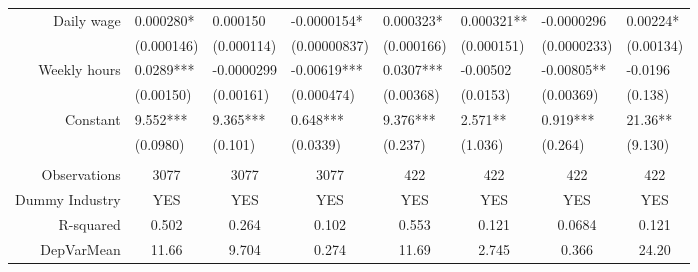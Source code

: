 \begin{tabular}{rrrrrrrr}
Daily wage & \multicolumn{1}{l}{0.000280*} & \multicolumn{1}{l}{0.000150} & \multicolumn{1}{l}{-0.0000154*} & \multicolumn{1}{l}{0.000323*} & \multicolumn{1}{l}{0.000321**} & \multicolumn{1}{l}{-0.0000296} & \multicolumn{1}{l}{0.00224*} \\
      & \multicolumn{1}{l}{(0.000146)} & \multicolumn{1}{l}{(0.000114)} & \multicolumn{1}{l}{(0.00000837)} & \multicolumn{1}{l}{(0.000166)} & \multicolumn{1}{l}{(0.000151)} & \multicolumn{1}{l}{(0.0000233)} & \multicolumn{1}{l}{(0.00134)} \\
Weekly hours & \multicolumn{1}{l}{0.0289***} & \multicolumn{1}{l}{-0.0000299} & \multicolumn{1}{l}{-0.00619***} & \multicolumn{1}{l}{0.0307***} & \multicolumn{1}{l}{-0.00502} & \multicolumn{1}{l}{-0.00805**} & \multicolumn{1}{l}{-0.0196} \\
      & \multicolumn{1}{l}{(0.00150)} & \multicolumn{1}{l}{(0.00161)} & \multicolumn{1}{l}{(0.000474)} & \multicolumn{1}{l}{(0.00368)} & \multicolumn{1}{l}{(0.0153)} & \multicolumn{1}{l}{(0.00369)} & \multicolumn{1}{l}{(0.138)} \\
Constant & \multicolumn{1}{l}{9.552***} & \multicolumn{1}{l}{9.365***} & \multicolumn{1}{l}{0.648***} & \multicolumn{1}{l}{9.376***} & \multicolumn{1}{l}{2.571**} & \multicolumn{1}{l}{0.919***} & \multicolumn{1}{l}{21.36**} \\
      & \multicolumn{1}{l}{(0.0980)} & \multicolumn{1}{l}{(0.101)} & \multicolumn{1}{l}{(0.0339)} & \multicolumn{1}{l}{(0.237)} & \multicolumn{1}{l}{(1.036)} & \multicolumn{1}{l}{(0.264)} & \multicolumn{1}{l}{(9.130)} \\
      &       &       &       &       &       &       &  \\
      \midrule
Observations & \multicolumn{1}{c}{3077} & \multicolumn{1}{c}{3077} & \multicolumn{1}{c}{3077} & \multicolumn{1}{c}{422} & \multicolumn{1}{c}{422} & \multicolumn{1}{c}{422} & \multicolumn{1}{c}{422} \\
Dummy Industry & \multicolumn{1}{c}{YES} & \multicolumn{1}{c}{YES} & \multicolumn{1}{c}{YES} & \multicolumn{1}{c}{YES} & \multicolumn{1}{c}{YES} & \multicolumn{1}{c}{YES} & \multicolumn{1}{c}{YES} \\
R-squared & \multicolumn{1}{c}{0.502} & \multicolumn{1}{c}{0.264} & \multicolumn{1}{c}{0.102} & \multicolumn{1}{c}{0.553} & \multicolumn{1}{c}{0.121} & \multicolumn{1}{c}{0.0684} & \multicolumn{1}{c}{0.121} \\
DepVarMean & \multicolumn{1}{c}{11.66} & \multicolumn{1}{c}{9.704} & \multicolumn{1}{c}{0.274} & \multicolumn{1}{c}{11.69} & \multicolumn{1}{c}{2.745} & \multicolumn{1}{c}{0.366} & \multicolumn{1}{c}{24.20} \\
\bottomrule
\end{tabular}%
